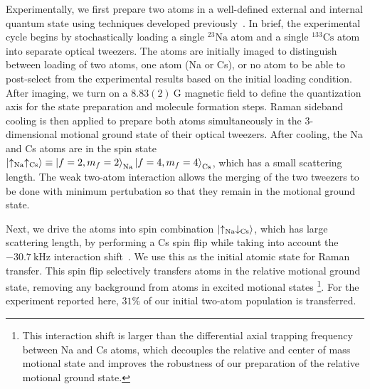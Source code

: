 \documentclass[aps,prl,twocolumn,10pt,superscriptaddress]{revtex4-1}
\newcommand{\Na}{\mathrm{Na}}
\newcommand{\Cs}{\mathrm{Cs}}
\newcommand{\todo}[1]{}
\begin{document}
Experimentally, we first prepare two atoms in a well-defined external and internal quantum state
using techniques developed previously~\cite{Liu2018, Liu2019, Wang2019}.
In brief, the experimental cycle begins by stochastically loading a single ${}^{23}\Na$ atom
and a single ${}^{133}\Cs$ atom into separate optical tweezers.
The atoms are initially imaged to distinguish between loading of two atoms,
one atom (Na or Cs), or no atom to be able to post-select from the experimental results
based on the initial loading condition.
After imaging, we turn on a $8.83(2)~\mathrm{G}$ magnetic field to define the quantization axis
for the state preparation and molecule formation steps.
Raman sideband cooling is then applied to prepare both atoms simultaneously
in the 3-dimensional motional ground state of their optical tweezers.
After cooling, the Na and Cs atoms are in the spin state~$\ket{\uparrow_{\Na}\uparrow_{\Cs}}\equiv \ket{f=2,m_f=2}_{\Na}\ket{f=4,m_f=4}_{\Cs}$,
which has a small scattering length.
The weak two-atom interaction allows the merging of the two tweezers to be done
with minimum pertubation so that they remain in the motional ground state.

Next, we drive the atoms into spin combination $\ket{\uparrow_{\Na} \downarrow_{\Cs}}$,
which has large scattering length,
by performing a Cs spin flip while taking into account
the $-30.7~\mathrm{kHz}$ interaction shift~\cite{Hood2019}.
We use this as the initial atomic state for Raman transfer.
This spin flip selectively transfers atoms in the relative motional ground state,
removing any background from atoms in excited motional states
\footnote{This interaction shift is larger than the differential axial trapping frequency
  between Na and Cs atoms, which decouples the relative and center of mass motional state
  and improves the robustness of our preparation of the relative motional ground state.}.
For the experiment reported here,
$31\mathrm{\%}$ of our initial two-atom population is transferred.
\end{document}
